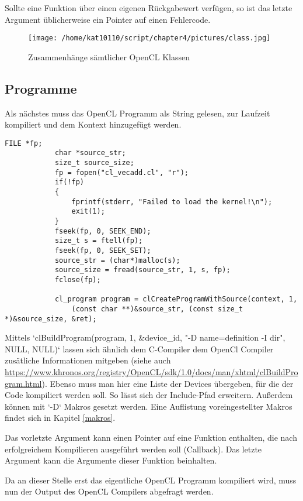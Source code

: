 			Sollte eine Funktion über einen eigenen Rückgabewert verfügen, so ist das letzte Argument üblicherweise ein Pointer auf einen Fehlercode.
			\begin{figure}[h]
				\centering
				\texttt{[image: /home/kat10110/script/chapter4/pictures/class.jpg]}
				\caption{Zusammenhänge sämtlicher OpenCL Klassen}
				\label{4:class}
			\end{figure}				
				
			\subsection{Programme}
			Als nächstes muss das OpenCL Programm als String gelesen, zur Laufzeit kompiliert und dem Kontext hinzugefügt werden. 
			\begin{lstlisting}[caption=OpenCL Programm]
			FILE *fp;
			char *source_str;
			size_t source_size;
			fp = fopen("cl_vecadd.cl", "r");
			if(!fp)
			{
				fprintf(stderr, "Failed to load the kernel!\n");
				exit(1);
			}
			fseek(fp, 0, SEEK_END);
			size_t s = ftell(fp);
			fseek(fp, 0, SEEK_SET); 
			source_str = (char*)malloc(s);
			source_size = fread(source_str, 1, s, fp);
			fclose(fp);
			
			cl_program program = clCreateProgramWithSource(context, 1, 
				(const char **)&source_str, (const size_t *)&source_size, &ret);
			\end{lstlisting}
			
			Mittels \li`clBuildProgram(program, 1, &device_id, "-D name=definition -I dir", NULL, NULL)` lassen sich ähnlich dem C-Compiler dem OpenCl Compiler zusätliche Informationen mitgeben (siehe auch \url{https://www.khronos.org/registry/OpenCL/sdk/1.0/docs/man/xhtml/clBuildProgram.html}). Ebenso muss man hier eine Liste der Devices übergeben, für die der Code kompiliert werden soll. So lässt sich der Include-Pfad erweitern. Außerdem können mit \li`-D` Makros gesetzt werden. Eine Auflistung voreingestellter Makros findet sich in Kapitel \ref{makros}.
			
			Das vorletzte Argument kann einen Pointer auf eine Funktion enthalten, die nach erfolgreichem Kompilieren ausgeführt werden soll (Callback). Das letzte Argument kann die Argumente dieser Funktion beinhalten.
			
			Da an dieser Stelle erst das eigentliche OpenCL Programm kompiliert wird, muss nun der Output des OpenCL Compilers abgefragt werden.
			

